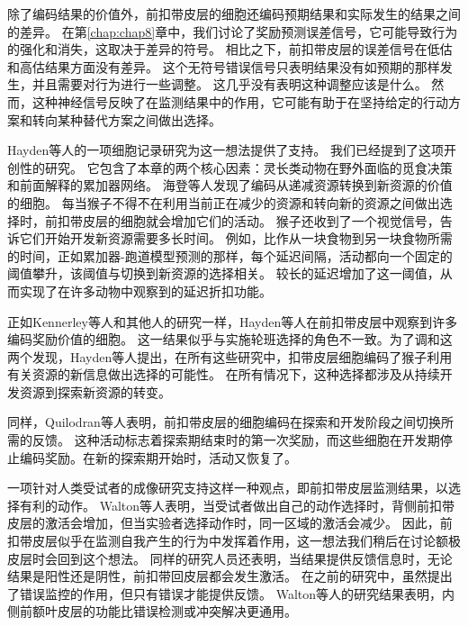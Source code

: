 除了编码结果的价值外，前扣带皮层的细胞还编码预期结果和实际发生的结果之间的差异。
在第\ref{chap:chap8}章中，我们讨论了奖励预测误差信号，它可能导致行为的强化和消失，这取决于差异的符号。
相比之下，前扣带皮层的误差信号在低估和高估结果方面没有差异\cite{Hayden et al,2011a}。
这个无符号错误信号只表明结果没有如预期的那样发生，并且需要对行为进行一些调整。
这几乎没有表明这种调整应该是什么。
然而，这种神经信号反映了在监测结果中的作用，它可能有助于在坚持给定的行动方案和转向某种替代方案之间做出选择。\par


Hayden等人\cite{hayden2011neuronal}的一项细胞记录研究为这一想法提供了支持。
我们已经提到了这项开创性的研究。
它包含了本章的两个核心因素：灵长类动物在野外面临的觅食决策和前面解释的累加器网络。
海登等人发现了编码从递减资源转换到新资源的价值的细胞。
每当猴子不得不在利用当前正在减少的资源和转向新的资源之间做出选择时，前扣带皮层的细胞就会增加它们的活动。
猴子还收到了一个视觉信号，告诉它们开始开发新资源需要多长时间。
例如，比作从一块食物到另一块食物所需的时间，正如累加器-跑道模型预测的那样，每个延迟间隔，活动都向一个固定的阈值攀升，该阈值与切换到新资源的选择相关。
较长的延迟增加了这一阈值，从而实现了在许多动物中观察到的延迟折扣功能。\par


正如Kennerley等人和其他人的研究一样\cite{matsumoto2003neuronal,seo2007temporal}，Hayden等人在前扣带皮层中观察到许多编码奖励价值的细胞\cite{hayden2009fictive,hayden2010neurons}。
这一结果似乎与实施轮班选择的角色不一致。为了调和这两个发现，Hayden等人\cite{hayden2011neuronal}提出，在所有这些研究中，扣带皮层细胞编码了猴子利用有关资源的新信息做出选择的可能性。
在所有情况下，这种选择都涉及从持续开发资源到探索新资源的转变。\par


同样，Quilodran等人\cite{quilodran2008behavioral}表明，前扣带皮层的细胞编码在探索和开发阶段之间切换所需的反馈。
这种活动标志着探索期结束时的第一次奖励，而这些细胞在开发期停止编码奖励。在新的探索期开始时，活动又恢复了。\par


一项针对人类受试者的成像研究支持这样一种观点，即前扣带皮层监测结果，以选择有利的动作。
Walton等人\cite{walton2004interactions}表明，当受试者做出自己的动作选择时，背侧前扣带皮层的激活会增加，但当实验者选择动作时，同一区域的激活会减少。
因此，前扣带皮层似乎在监测自我产生的行为中发挥着作用，这一想法我们稍后在讨论额极皮层时会回到这个想法。
同样的研究人员还表明，当结果提供反馈信息时，无论结果是阳性还是阴性，前扣带回皮层都会发生激活。
在之前的研究中，虽然提出了错误监控的作用，但只有错误才能提供反馈\cite{yeung2004neural}。
Walton等人的研究结果表明，内侧前额叶皮层的功能比错误检测或冲突解决更通用。\par



